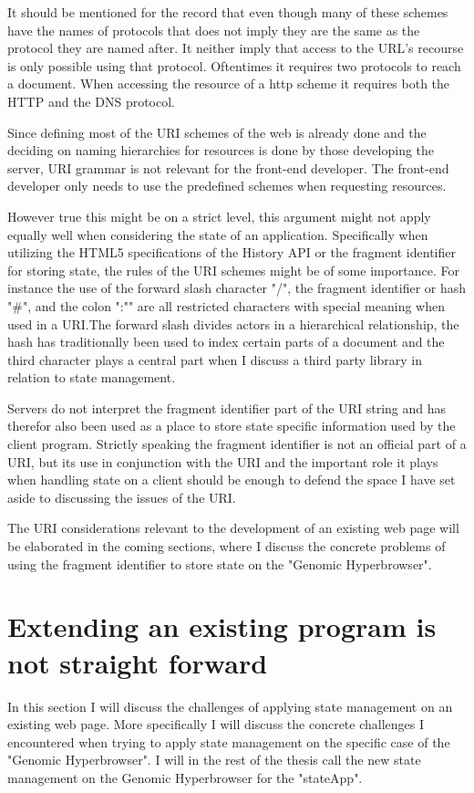 \documentclass[english]{ifimaster}
\begin{document}
It should be mentioned for the record that even though many of these schemes have the names of protocols that does not imply they are the same as the protocol they are named after. It neither imply that access to the URL's recourse is only possible using that protocol. Oftentimes it requires two protocols to reach a document. When accessing the resource of a http scheme it requires both the HTTP and the DNS protocol\parencite{rfc_URI}.

Since defining most of the URI schemes of the web is already done and the deciding on naming hierarchies for resources is done by those developing the server, URI grammar is not relevant for the front-end developer. The front-end developer only needs to use the predefined schemes when requesting resources. 

However true this might be on a strict level, this argument might not apply equally well when considering the state of an application. Specifically when utilizing the HTML5 specifications of the History API or the fragment identifier for storing state, the rules of the URI schemes might be of some importance. For instance the use of the forward slash character "/", the fragment identifier or hash "\#", and the colon ":"" are all restricted characters with special meaning when used in a URI.The forward slash divides actors in a hierarchical relationship, the hash has traditionally been used to index certain parts of a document and the third character plays a central part when I discuss a third party library in relation to state management. 

Servers do not interpret the fragment identifier part of the URI string and has therefor also been used as a place to store state specific information used by the client program. Strictly speaking the fragment identifier is not an official part of a URI, but its use in conjunction with the URI and the important role it plays when handling state on a client should be enough to defend the space I have set aside to discussing the issues of the URI.

The URI considerations relevant to the development of an existing web page will be elaborated in the coming sections, where I discuss the concrete problems of using the fragment identifier to store state on the "Genomic Hyperbrowser". 

\section{Extending an existing program is not straight forward}
In this section I will discuss the challenges of applying state management on an existing web page. More specifically I will discuss the concrete challenges I encountered when trying to apply state management on the specific case of the "Genomic Hyperbrowser". I will in the rest of the thesis call the new state management on the Genomic Hyperbrowser for the "stateApp".
\end{document}
